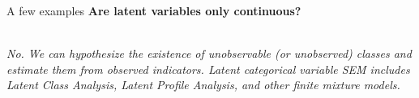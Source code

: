 \documentclass{beamer}
\begin{document}
\begin{frame}{A few examples}
    \centering
    \textbf{Are latent variables only continuous?} \\
    \vspace{2em}
    \vspace{2em} \\
    \textit{No. We can hypothesize the existence of unobservable (or unobserved) classes and estimate them from observed indicators. Latent categorical variable SEM includes Latent Class Analysis, Latent Profile Analysis, and other finite mixture models.}
\end{frame}
\end{document}
